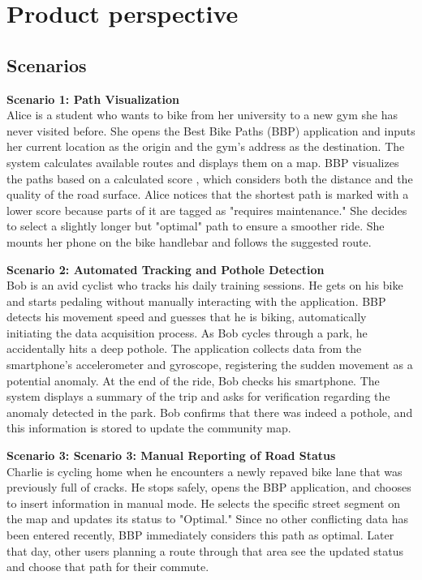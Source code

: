 \section{Product perspective}
\subsection{Scenarios}
\textbf{Scenario 1: Path Visualization}\\
Alice is a student who wants to bike from her university to a new gym she has never visited before.
She opens the Best Bike Paths (BBP) application and inputs her current location as the origin and the gym's address as the destination.
The system calculates available routes and displays them on a map. BBP visualizes the paths based on a calculated score ,
which considers both the distance and the quality of the road surface. Alice notices that the shortest path is marked with a lower score because parts of it are tagged as "requires maintenance."
She decides to select a slightly longer but "optimal" path to ensure a smoother ride. She mounts her phone on the bike handlebar and follows the suggested route.

\textbf{Scenario 2: Automated Tracking and Pothole Detection}\\
Bob is an avid cyclist who tracks his daily training sessions. He gets on his bike and starts pedaling without manually interacting with the application.
BBP detects his movement speed and guesses that he is biking, automatically initiating the data acquisition process. As Bob cycles through a park, he accidentally hits a deep pothole.
The application collects data from the smartphone's accelerometer and gyroscope, registering the sudden movement as a potential anomaly.
At the end of the ride, Bob checks his smartphone. The system displays a summary of the trip and asks for verification regarding the anomaly detected in the park.
Bob confirms that there was indeed a pothole, and this information is stored to update the community map.

\textbf{Scenario 3: Scenario 3: Manual Reporting of Road Status}\\
Charlie is cycling home when he encounters a newly repaved bike lane that was previously full of cracks.
He stops safely, opens the BBP application, and chooses to insert information in manual mode. He selects the specific street segment on the map and updates its status to "Optimal."
Since no other conflicting data has been entered recently, BBP immediately considers this path as optimal. Later that day, other users planning a route through that area see the updated status and choose that path for their commute.

